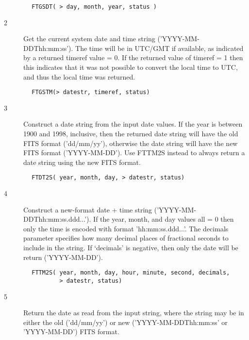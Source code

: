 \documentclass[11pt]{book}
\begin{document}
\begin{verbatim}
        FTGSDT( > day, month, year, status )
\end{verbatim}


\begin{description}
\item[2 ] Get the current system date and time string ('YYYY-MM-DDThh:mm:ss').
The time will be in UTC/GMT if available, as indicated by a returned timeref
value = 0.  If the returned value of timeref = 1 then this indicates that
it was not possible to convert the local time to UTC, and thus the local
time was returned.
\end{description}

\begin{verbatim}
        FTGSTM(> datestr, timeref, status)
\end{verbatim}


\begin{description}
\item[3 ] Construct a date string from the input date values.  If the year
is between 1900 and 1998, inclusive, then the returned date string will
have the old FITS format ('dd/mm/yy'), otherwise the date string will
have the new FITS format ('YYYY-MM-DD').  Use FTTM2S instead
 to always return a date string using the new FITS format.
\end{description}

\begin{verbatim}
        FTDT2S( year, month, day, > datestr, status)
\end{verbatim}


\begin{description}
\item[4 ] Construct a new-format date + time string ('YYYY-MM-DDThh:mm:ss.ddd...').
  If the year, month, and day values all = 0 then only the time is encoded
  with format 'hh:mm:ss.ddd...'.  The decimals parameter specifies how many
  decimal places of fractional seconds to include in the string.  If `decimals'
 is negative, then only the date will be return ('YYYY-MM-DD').
\end{description}

\begin{verbatim}
        FTTM2S( year, month, day, hour, minute, second, decimals,
                > datestr, status)
\end{verbatim}


\begin{description}
\item[5 ] Return the date as read from the input string, where the string may be
in either the old ('dd/mm/yy')  or new ('YYYY-MM-DDThh:mm:ss' or
'YYYY-MM-DD') FITS format.
\end{description}
\end{document}
